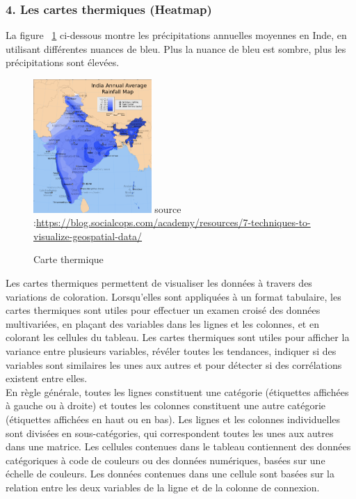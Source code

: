 \documentclass[french, a4paper, 12pt]{report}
\begin{document}
\subsubsection{4. Les cartes thermiques (Heatmap)}
La figure ~\ref{fig:1.11} ci-dessous montre les précipitations annuelles moyennes en Inde, en utilisant différentes nuances de bleu. Plus la nuance de bleu est sombre, plus les précipitations sont élevées.
\begin{figure}
\centering
\includegraphics[width=0.4\textwidth]{images/Heatmap.png}
\scriptsize{source :\url{https://blog.socialcops.com/academy/resources/7-techniques-to-visualize-geospatial-data/}}
\caption{\label{fig:1.11} Carte thermique}
\end{figure}
Les cartes thermiques permettent de visualiser les données à travers des variations de coloration. Lorsqu'elles sont appliquées à un format tabulaire, les cartes thermiques sont utiles pour effectuer un examen croisé des données multivariées, en plaçant des variables dans les lignes et les colonnes, et en colorant les cellules du tableau. Les cartes thermiques sont utiles pour afficher la variance entre plusieurs variables, révéler toutes les tendances, indiquer si des variables sont similaires les unes aux autres et pour détecter si des corrélations existent entre elles. \\

En règle générale, toutes les lignes constituent une catégorie (étiquettes affichées à gauche ou à droite) et toutes les colonnes constituent une autre catégorie (étiquettes affichées en haut ou en bas). Les lignes et les colonnes individuelles sont divisées en sous-catégories, qui correspondent toutes les unes aux autres dans une matrice. Les cellules contenues dans le tableau contiennent des données catégoriques à code de couleurs ou des données numériques, basées sur une échelle de couleurs. Les données contenues dans une cellule sont basées sur la relation entre les deux variables de la ligne et de la colonne de connexion.
\end{document}
